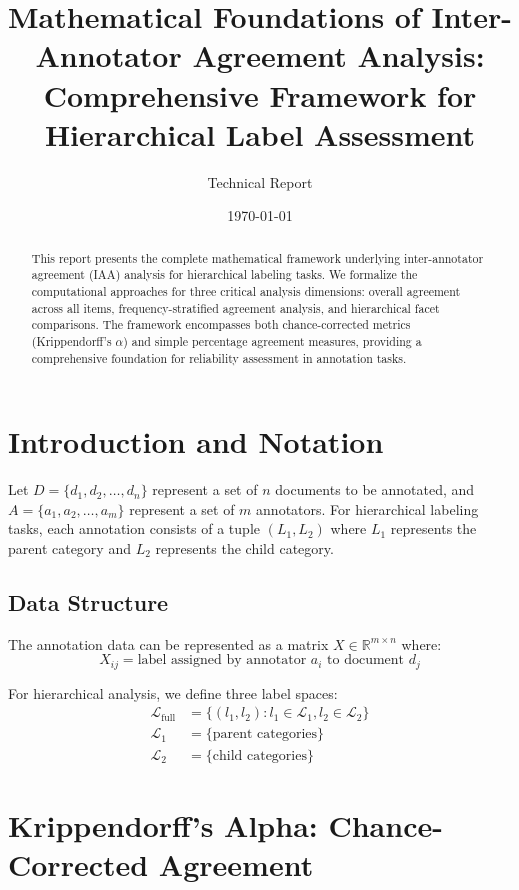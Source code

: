 \documentclass[11pt]{article}
\title{\textbf{Mathematical Foundations of Inter-Annotator Agreement Analysis:\\ Comprehensive Framework for Hierarchical Label Assessment}}
\author{Technical Report}
\date{\today}
\begin{document}
\maketitle

\begin{abstract}
This report presents the complete mathematical framework underlying inter-annotator agreement (IAA) analysis for hierarchical labeling tasks. We formalize the computational approaches for three critical analysis dimensions: overall agreement across all items, frequency-stratified agreement analysis, and hierarchical facet comparisons. The framework encompasses both chance-corrected metrics (Krippendorff's $\alpha$) and simple percentage agreement measures, providing a comprehensive foundation for reliability assessment in annotation tasks.
\end{abstract}

\section{Introduction and Notation}

Let $D = \{d_1, d_2, \ldots, d_n\}$ represent a set of $n$ documents to be annotated, and $A = \{a_1, a_2, \ldots, a_m\}$ represent a set of $m$ annotators. For hierarchical labeling tasks, each annotation consists of a tuple $(L_1, L_2)$ where $L_1$ represents the parent category and $L_2$ represents the child category.

\subsection{Data Structure}

The annotation data can be represented as a matrix $X \in \mathbb{R}^{m \times n}$ where:
\begin{equation}
X_{ij} = \text{label assigned by annotator } a_i \text{ to document } d_j
\end{equation}

For hierarchical analysis, we define three label spaces:
\begin{align}
\mathcal{L}_{\text{full}} &= \{(l_1, l_2) : l_1 \in \mathcal{L}_1, l_2 \in \mathcal{L}_2\} \\
\mathcal{L}_1 &= \{\text{parent categories}\} \\
\mathcal{L}_2 &= \{\text{child categories}\}
\end{align}

\section{Krippendorff's Alpha: Chance-Corrected Agreement}
\end{document}
